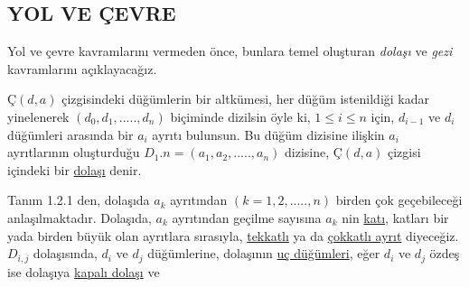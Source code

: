\documentclass[11pt]{amsbook}
\begin{document}

	\setcounter{section}{1}
	\setcounter{subsection}{1}
	\subsection{YOL VE ÇEVRE}
    	Yol ve çevre kavramlarını vermeden önce, bunlara temel oluşturan \emph{dolaşı} ve \emph{gezi} kavramlarını açıklayacağız.

    \begin{definition} 
        \( Ç(d, a) \) çizgisindeki düğümlerin bir altkümesi, her düğüm istenildiği kadar yinelenerek $(d_0,d_1,.....,d_n)$ biçiminde dizilsin öyle ki, $1\leq i \leq n$ için, $d_{i-1}$ ve $d_{i}$ düğümleri arasında bir $a_i$ ayrıtı bulunsun. Bu düğüm dizisine ilişkin $a_i$ ayrıtlarının oluşturduğu $D_1 . n = (a_1,a_2,.....,a_n)$ dizisine, \( Ç(d, a) \) çizgisi içindeki bir \underline{dolaşı} denir.
    \end{definition} 

        Tanım 1.2.1 den, dolaşıda $a_k$ ayrıtından $(k = 1,2,.....,n)$ birden çok geçebileceği anlaşılmaktadır. Dolaşıda, $a_k$ ayrıtından geçilme sayısına $a_k$ nin \underline{katı}, katları bir yada birden büyük olan ayrıtlara sırasıyla, 
        \underline{tekkatlı} ya da \underline{çokkatlı ayrıt} diyeceğiz. $D_{i,j}$ dolaşısında, $d_i$ ve $d_j$ düğümlerine, dolaşının \underline{uç düğümleri}, eğer $d_i$ ve $d_j$ özdeş ise dolaşıya \underline{kapalı dolaşı} ve
\end{document}

